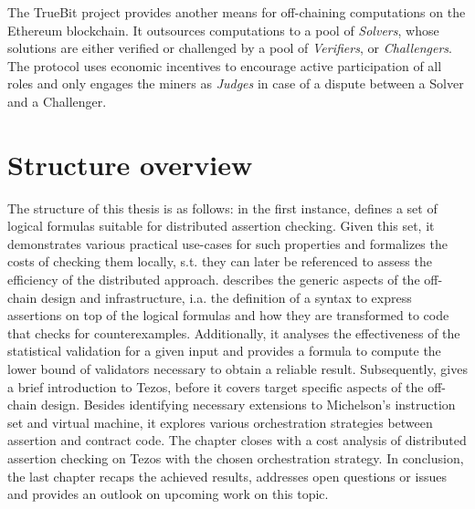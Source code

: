 The TrueBit \cite{teutsch_truebit} project provides another means for off-chaining computations on the Ethereum blockchain. It outsources computations to a pool of \textit{Solvers}, whose solutions are either verified or challenged by a pool of \textit{Verifiers}, or \textit{Challengers}. The protocol uses economic incentives to encourage active participation of all roles and only engages the miners as \textit{Judges} in case of a dispute between a Solver and a Challenger. 

\section{Structure overview}
The structure of this thesis is as follows: in the first instance,  defines a set of logical formulas suitable for distributed assertion checking. Given this set, it demonstrates various practical use-cases for such properties and formalizes the costs of checking them locally, s.t. they can later be referenced to assess the efficiency of the distributed approach.  describes the generic aspects of the off-chain design and infrastructure, i.a. the definition of a syntax to express assertions on top of the logical formulas and how they are transformed to code that checks for counterexamples. Additionally, it analyses the effectiveness of the statistical validation for a given input and provides a formula to compute the lower bound of validators necessary to obtain a reliable result. Subsequently,  gives a brief introduction to Tezos, before it covers target specific aspects of the off-chain design. Besides identifying necessary extensions to Michelson's instruction set and virtual machine, it explores various orchestration strategies between assertion and contract code. The chapter closes with a cost analysis of distributed assertion checking on Tezos with the chosen orchestration strategy. In conclusion, the last chapter recaps the achieved results, 
addresses open questions or issues and provides an outlook on upcoming work on this topic.